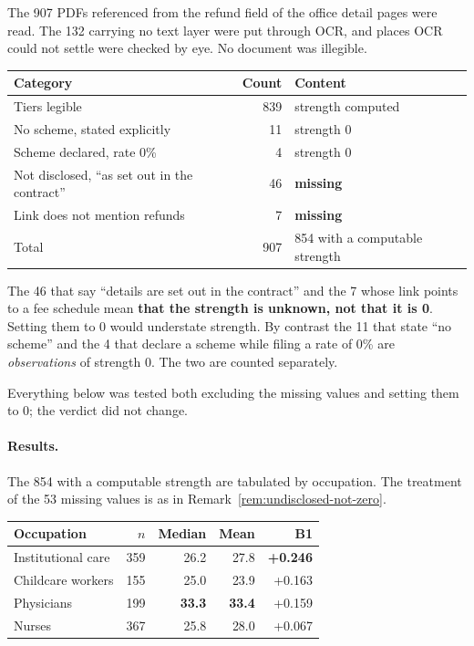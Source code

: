 The 907 PDFs referenced from the refund field of the office detail pages were read. The 132
carrying no text layer were put through OCR, and places OCR could not settle were checked by eye.
No document was illegible.

\begin{center}
\begin{tabularx}{\textwidth}{@{}lrX@{}}
\toprule
Category & Count & Content \\
\midrule
Tiers legible & 839 & strength computed \\
No scheme, stated explicitly & 11 & strength 0 \\
Scheme declared, rate 0\% & 4 & strength 0 \\
Not disclosed, ``as set out in the contract'' & 46 & \textbf{missing} \\
Link does not mention refunds & 7 & \textbf{missing} \\
\midrule
Total & 907 & 854 with a computable strength \\
\bottomrule
\end{tabularx}
\label{tab:henreikin-read}
\end{center}

\begin{remark}
\label{rem:undisclosed-not-zero}
The 46 that say ``details are set out in the contract'' and the 7 whose link points to a fee
schedule mean \textbf{that the strength is unknown, not that it is 0}. Setting them to 0 would
understate strength. By contrast the 11 that state ``no scheme'' and the 4 that declare a scheme
while filing a rate of 0\% are \emph{observations} of strength 0. The two are counted separately.

Everything below was tested both excluding the missing values and setting them to 0; the verdict
did not change.
\end{remark}

\paragraph{Results.}

The 854 with a computable strength are tabulated by occupation. The treatment of the 53 missing
values is as in Remark~\ref{rem:undisclosed-not-zero}.

\begin{center}
\begin{tabular}{@{}lrrrr@{}}
\toprule
Occupation & $n$ & Median & Mean & B1 \\
\midrule
Institutional care & 359 & 26.2 & 27.8 & \textbf{+0.246} \\
Childcare workers & 155 & 25.0 & 23.9 & +0.163 \\
Physicians & 199 & \textbf{33.3} & \textbf{33.4} & +0.159 \\
Nurses & 367 & 25.8 & 28.0 & +0.067 \\
\bottomrule
\end{tabular}
\label{tab:predZ-result}
\end{center}

